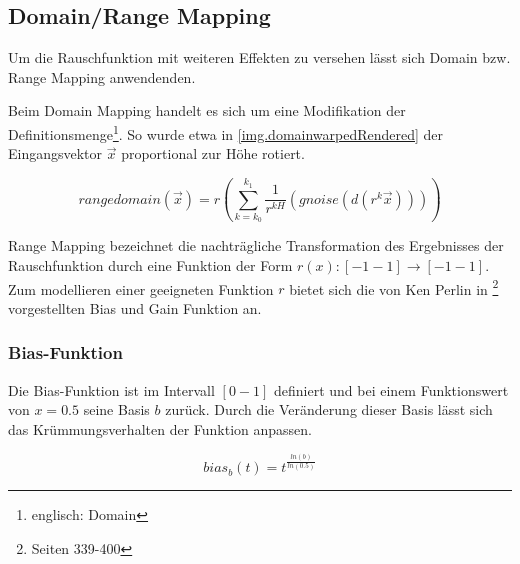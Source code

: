 


\subsection{Domain/Range Mapping}
Um die Rauschfunktion mit weiteren Effekten zu versehen lässt sich Domain bzw. Range Mapping anwendenden. 

Beim Domain Mapping handelt es sich um eine Modifikation der Definitionsmenge\footnote{englisch: Domain}. So wurde etwa in \autoref{img.domainwarpedRendered} der Eingangsvektor $\vec{x}$ proportional zur Höhe rotiert.

\begin{equation} \label{eq.domainrangemapping}
rangedomain(\vec{x}) = r\left( \sum_{k=k_0}^{k_1}\frac{1}{r^{kH}}(gnoise(d(r^k\vec{x})))\right)
\end{equation}

Range Mapping bezeichnet die nachträgliche Transformation des Ergebnisses der Rauschfunktion durch eine Funktion der Form $r(x): [-1-1]\to[-1-1]$.
Zum modellieren einer geeigneten Funktion $r$ bietet sich die von Ken Perlin in \cite{texturingAndModeling}\footnote{Seiten 339-400} vorgestellten
Bias und Gain Funktion an.


\subsubsection{Bias-Funktion}
Die Bias-Funktion ist im Intervall $[0-1]$ definiert und bei einem Funktionswert von $x=0.5$ seine Basis $b$ zurück. Durch die Veränderung dieser Basis lässt sich das Krümmungsverhalten der Funktion anpassen.

\begin{equation}
	bias_b(t)=t^{\frac{ln(b)}{ln(0.5)}}
\end{equation}

